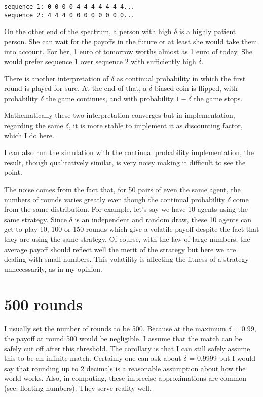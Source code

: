 \documentclass[12.5pt]{report}
\begin{document}
\begin{verbatim}
sequence 1: 0 0 0 0 4 4 4 4 4 4 4...
sequence 2: 4 4 4 0 0 0 0 0 0 0 0...
\end{verbatim}

On the other end of the spectrum, a person with high $\delta$ is a highly patient person. She can wait for the payoffs in the future or at least she would take them into account. For her, 1 euro of tomorrow worths almost as 1 euro of today. She would prefer sequence 1 over sequence 2 with sufficiently high $\delta$.

There is another interpretation of $\delta$ as continual probability in which the first round is played for sure. At the end of that, a $\delta$ biased coin is flipped, with probability $\delta$ the game continues, and with probability $1 - \delta$ the game stops. 

Mathematically these two interpretation converges but in implementation, regarding the same $\delta$, it is more stable to implement it as discounting factor, which I do here.

I can also run the simulation with the continual probability implementation, the result, though qualitatively similar, is very noisy making it difficult to see the point.

The noise comes from the fact that, for 50 pairs of even the same agent, the numbers of rounds varies greatly even though the continual probability $\delta$ come from the same distribution. For example, let's say we have 10 agents using the same strategy. Since $\delta$ is an independent and random draw, these 10 agents can get to play 10, 100 or 150 rounds which give a volatile payoff despite the fact that they are using the same strategy. Of course, with the law of large numbers, the average payoff should reflect well the merit of the strategy but here we are dealing with small numbers. This volatility is affecting the fitness of a strategy unnecessarily, as in my opinion.

\section{500 rounds}

I usually set the number of rounds to be 500. Because at the maximum $\delta$ = 0.99, the payoff at round 500 would be negligible. I assume that the match can be safely cut off after this threshold. The corollary is that I can still safely assume this to be an infinite match. Certainly one can ask about $\delta$ = 0.9999 but I would say that rounding up to 2 decimals is a reasonable assumption about how the world works. Also, in computing, these imprecise approximations are common (see: floating numbers). They serve reality well.
\end{document}
